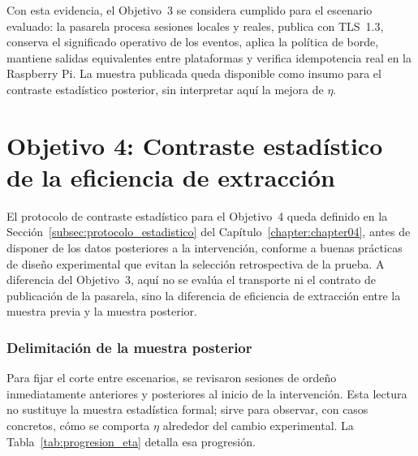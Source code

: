 Con esta evidencia, el Objetivo~3 se considera cumplido para el escenario evaluado: la pasarela procesa sesiones locales y reales, publica con \ac{TLS}~1.3, conserva el significado operativo de los eventos, aplica la política de borde, mantiene salidas equivalentes entre plataformas y verifica idempotencia real en la Raspberry Pi. La muestra publicada queda disponible como insumo para el contraste estadístico posterior, sin interpretar aquí la mejora de $\eta$.


\section{Objetivo 4: Contraste estadístico de la eficiencia de extracción}
\label{sec:analisis-estadistico}

El protocolo de contraste estadístico para el Objetivo~4 queda definido en la Sección~\ref{subsec:protocolo_estadistico} del Capítulo~\ref{chapter:chapter04}, antes de disponer de los datos posteriores a la intervención, conforme a buenas prácticas de diseño experimental que evitan la selección retrospectiva de la prueba. A diferencia del Objetivo~3, aquí no se evalúa el transporte ni el contrato de publicación de la pasarela, sino la diferencia de eficiencia de extracción entre la muestra previa y la muestra posterior.

\subsubsection*{Delimitación de la muestra posterior}

Para fijar el corte entre escenarios, se revisaron sesiones de ordeño inmediatamente anteriores y posteriores al inicio de la intervención. Esta lectura no sustituye la muestra estadística formal; sirve para observar, con casos concretos, cómo se comporta $\eta$ alrededor del cambio experimental. La Tabla~\ref{tab:progresion_eta} detalla esa progresión.

